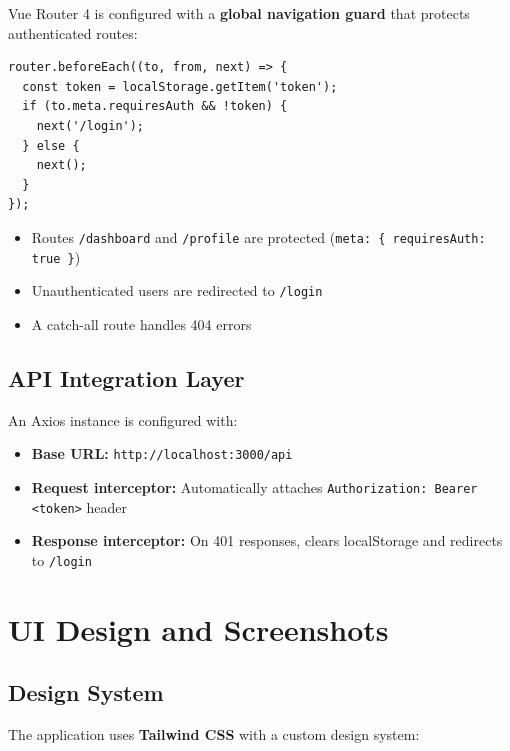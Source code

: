 \documentclass[12pt, a4paper]{article}
\begin{document}
Vue Router 4 is configured with a \textbf{global navigation guard} that protects authenticated routes:

\begin{lstlisting}
router.beforeEach((to, from, next) => {
  const token = localStorage.getItem('token');
  if (to.meta.requiresAuth && !token) {
    next('/login');
  } else {
    next();
  }
});
\end{lstlisting}

\begin{itemize}[nosep]
    \item Routes \texttt{/dashboard} and \texttt{/profile} are protected (\texttt{meta: \{ requiresAuth: true \}})
    \item Unauthenticated users are redirected to \texttt{/login}
    \item A catch-all route handles 404 errors
\end{itemize}

\subsection{API Integration Layer}

An Axios instance is configured with:

\begin{itemize}[nosep]
    \item \textbf{Base URL:} \texttt{http://localhost:3000/api}
    \item \textbf{Request interceptor:} Automatically attaches \texttt{Authorization: Bearer <token>} header
    \item \textbf{Response interceptor:} On 401 responses, clears localStorage and redirects to \texttt{/login}
\end{itemize}

\section{UI Design and Screenshots}

\subsection{Design System}

The application uses \textbf{Tailwind CSS} with a custom design system:
\end{document}
